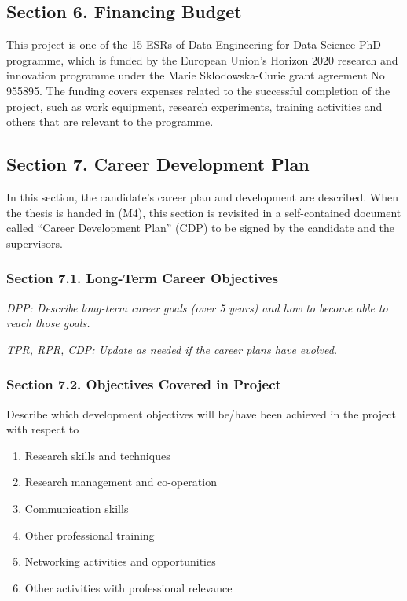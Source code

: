 \documentclass[12pt]{article}
\begin{document}
\subsection*{Section 6. Financing Budget}

This project is one of the 15 ESRs of Data Engineering for Data Science PhD programme, which is funded by the European Union's Horizon 2020 research and innovation programme under the Marie Sklodowska-Curie grant agreement No 955895. The funding covers expenses related to the successful completion of the project, such as work equipment, research experiments, training activities and others
that are relevant to the programme.



\subsection*{Section 7. Career Development Plan}
In this section, the candidate's career plan and development are described. When the thesis is handed in (M4), this section is revisited in a self-contained document called ``Career Development Plan'' (CDP) to be signed by the candidate and the supervisors.

\subsubsection*{Section 7.1. Long-Term Career Objectives}
\begin{shaded}
\noindent
\emph{DPP: Describe long-term career goals (over 5 years) and how to become able to reach those goals.}

\noindent
\emph{TPR, RPR, CDP: Update as needed if the career plans have evolved.}

\end{shaded}

\subsubsection*{Section 7.2. Objectives Covered in Project}
Describe which development objectives will be/have been achieved in the project with respect to
\begin{enumerate}
\item Research skills and techniques
\item Research management and co-operation
\item Communication skills
\item Other professional training
\item Networking activities and opportunities
\item Other activities with professional relevance
\end{enumerate}
\end{document}
